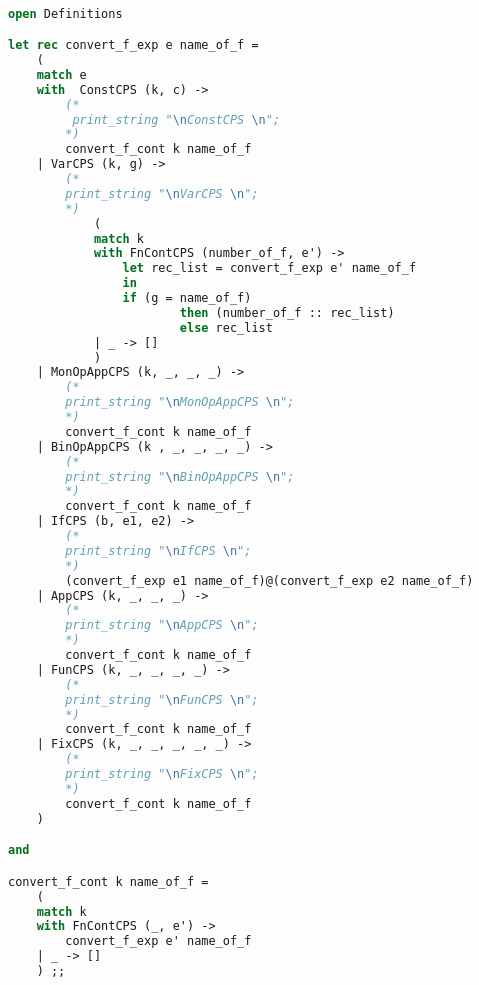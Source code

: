 \begin{lstlisting}[language=Caml, caption=Tail recursion for CPS transformed expressions]

open Definitions

let rec convert_f_exp e name_of_f = 
    (
    match e
    with  ConstCPS (k, c) -> 
        (*
         print_string "\nConstCPS \n";
        *)
        convert_f_cont k name_of_f
    | VarCPS (k, g) -> 
        (*
        print_string "\nVarCPS \n";
        *)
            (
            match k 
            with FnContCPS (number_of_f, e') -> 
                let rec_list = convert_f_exp e' name_of_f 
                in 
                if (g = name_of_f) 
                        then (number_of_f :: rec_list) 
                        else rec_list
            | _ -> []
            )
    | MonOpAppCPS (k, _, _, _) -> 
        (*
        print_string "\nMonOpAppCPS \n";
        *)
        convert_f_cont k name_of_f
    | BinOpAppCPS (k , _, _, _, _) -> 
        (*
        print_string "\nBinOpAppCPS \n";
        *)
        convert_f_cont k name_of_f
    | IfCPS (b, e1, e2) ->
        (*
        print_string "\nIfCPS \n";
        *)
        (convert_f_exp e1 name_of_f)@(convert_f_exp e2 name_of_f)
    | AppCPS (k, _, _, _) ->
        (*
        print_string "\nAppCPS \n";
        *)
        convert_f_cont k name_of_f
    | FunCPS (k, _, _, _, _) ->
        (*
        print_string "\nFunCPS \n";
        *)
        convert_f_cont k name_of_f
    | FixCPS (k, _, _, _, _, _) ->
        (*
        print_string "\nFixCPS \n";
        *)
        convert_f_cont k name_of_f
    )

and 

convert_f_cont k name_of_f =
    (
    match k
    with FnContCPS (_, e') -> 
        convert_f_exp e' name_of_f
    | _ -> []
    ) ;;



\end{lstlisting}
